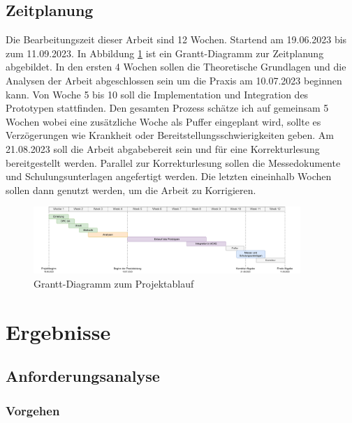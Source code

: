 \documentclass[a4paper, 12pt, oneside]{scrbook}
\begin{document}
	
	\section{Zeitplanung}
	
	Die Bearbeitungszeit dieser Arbeit sind 12 Wochen. Startend am 19.06.2023 bis zum 11.09.2023. In Abbildung \ref{fig:Grantt} ist ein Grantt-Diagramm zur Zeitplanung abgebildet. In den ersten 4 Wochen sollen die Theoretische Grundlagen und die Analysen der Arbeit abgeschlossen sein um die Praxis am 10.07.2023 beginnen kann. Von Woche 5 bis 10 soll die Implementation und Integration des Prototypen stattfinden. Den gesamten Prozess schätze ich auf gemeinsam 5 Wochen wobei eine zusätzliche Woche als Puffer eingeplant wird, sollte es Verzögerungen wie Krankheit oder Bereitstellungsschwierigkeiten geben. Am 21.08.2023 soll die Arbeit abgabebereit sein und für eine Korrekturlesung bereitgestellt werden. Parallel zur Korrekturlesung sollen die Messedokumente und Schulungsunterlagen angefertigt werden. Die letzten eineinhalb Wochen sollen dann genutzt werden, um die Arbeit zu Korrigieren.
	
	\begin{figure}[H]
		\centering
		\includegraphics[width=0.9\textwidth]{res/analysen/Grantt-Diagramm.pdf}
		\caption{Grantt-Diagramm zum Projektablauf}
		\label{fig:Grantt}
	\end{figure}
	
	
\chapter{Ergebnisse}\label{ch:Ergebnisse}
	
	
	\section{Anforderungsanalyse}
	
		\subsection{Vorgehen}
		
\end{document}
